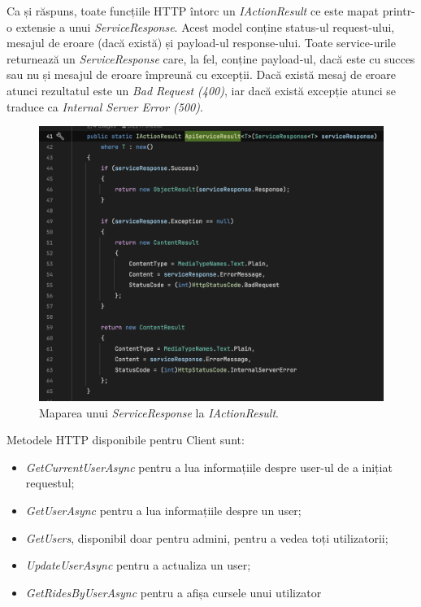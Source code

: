 Ca și răspuns, toate funcțiile HTTP întorc un \textit{IActionResult} ce este mapat printr-o extensie
a unui \textit{ServiceResponse}. Acest model conține status-ul request-ului, mesajul de eroare (dacă
există) și payload-ul response-ului. Toate service-urile returnează un \textit{ServiceResponse}
care, la fel, conține payload-ul, dacă este cu succes sau nu și mesajul de eroare împreună cu excepții.
Dacă există mesaj de eroare atunci rezultatul este un \textit{Bad Request (400)}, iar dacă există
excepție atunci se traduce ca \textit{Internal Server Error (500)}.

\begin{figure}[H]
    \centering
    \includegraphics[width=14cm]{Assets/HttpResponse.png}
    \caption{Maparea unui \textit{ServiceResponse} la \textit{IActionResult}.}
    \label{fig:HttpResponse}
\end{figure}

Metodele HTTP disponibile pentru Client sunt:
\begin{itemize}
    \item \textit{GetCurrentUserAsync} pentru a lua informațiile despre user-ul de a inițiat requestul;
    \item \textit{GetUserAsync} pentru a lua informațiile despre un user;
    \item \textit{GetUsers}, disponibil doar pentru admini, pentru a vedea toți utilizatorii;
    \item \textit{UpdateUserAsync} pentru a actualiza un user;
    \item \textit{GetRidesByUserAsync} pentru a afișa cursele unui utilizator
\end{itemize}

